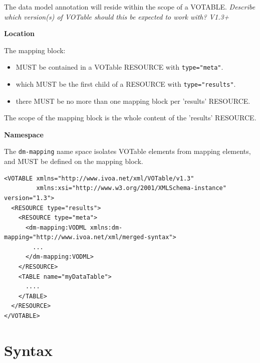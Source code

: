 \documentclass[11pt,a4paper]{ivoa}
\begin{document}
The data model annotation will reside within the scope of a VOTABLE.
\textit{ Describe which version(s) of VOTable should this be expected to work with? V1.3+ } \newline

\noindent \textbf{Location}

The mapping block:
\begin{itemize}
\item MUST be contained in a VOTable RESOURCE with \texttt{type="meta"}.
\item which MUST be the first child of a RESOURCE with \texttt{type="results"}.
\item there MUST be no more than one mapping block per 'results' RESOURCE.
\end{itemize}

The scope of the mapping block is the whole content of the 'results' RESOURCE. \newline

\noindent \textbf{Namespace}

The \texttt{dm-mapping} name space isolates VOTable elements from mapping elements, and MUST be defined on the mapping block. \newline

\begin{lstlisting}[frame=single,caption={Mapping block in a VOTable},style=XML,basicstyle=\tiny]
<VOTABLE xmlns="http://www.ivoa.net/xml/VOTable/v1.3" 
         xmlns:xsi="http://www.w3.org/2001/XMLSchema-instance" version="1.3">
  <RESOURCE type="results">
    <RESOURCE type="meta">
      <dm-mapping:VODML xmlns:dm-mapping="http://www.ivoa.net/xml/merged-syntax">
        ...
      </dm-mapping:VODML>
    </RESOURCE>
    <TABLE name="myDataTable">
      ....
    </TABLE>
  </RESOURCE>
</VOTABLE>
\end{lstlisting}


\pagebreak
\section{Syntax}
\end{document}
